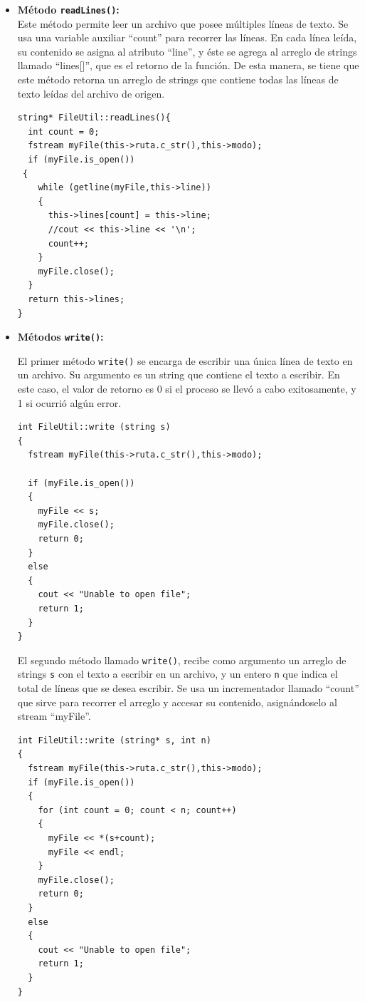\begin{itemize}
\item \textbf{Método \texttt{readLines()}:}\\

Este método permite leer un archivo que posee múltiples líneas de texto. Se usa una variable auxiliar ``count'' para recorrer las líneas. En cada línea leída, su contenido se asigna al atributo ``line'', y éste se agrega al arreglo de strings llamado ``lines[]'', que es el retorno de la función. De esta manera, se tiene que este método retorna un arreglo de strings que contiene todas las líneas de texto leídas del archivo de origen. 

\begin{verbatim}
string* FileUtil::readLines(){
  int count = 0;
  fstream myFile(this->ruta.c_str(),this->modo);
  if (myFile.is_open())
 {
    while (getline(myFile,this->line))
    {
      this->lines[count] = this->line;
      //cout << this->line << '\n';
      count++;
    }
    myFile.close();
  }
  return this->lines;
}
\end{verbatim}


\item \textbf{Métodos \texttt{write()}:}

El primer método \texttt{write()} se encarga de escribir una única línea de texto en un archivo. Su argumento es un string que contiene el texto a escribir. En este caso, el valor de retorno es 0 si el proceso se llevó a cabo exitosamente, y 1 si ocurrió algún error. 

\begin{verbatim}
int FileUtil::write (string s)
{
  fstream myFile(this->ruta.c_str(),this->modo);

  if (myFile.is_open())
  {
    myFile << s;
    myFile.close();
    return 0;
  }
  else
  {
    cout << "Unable to open file";
    return 1;
  }
}
\end{verbatim}

El segundo método llamado \texttt{write()}, recibe como argumento un arreglo de strings \texttt{s} con el texto a escribir en un archivo, y un entero \texttt{n} que indica el total de líneas que se desea escribir. Se usa un incrementador llamado ``count'' que sirve para recorrer el arreglo y accesar su contenido, asignándoselo al stream ``myFile''.

\begin{verbatim}
int FileUtil::write (string* s, int n)
{
  fstream myFile(this->ruta.c_str(),this->modo);
  if (myFile.is_open())
  {
    for (int count = 0; count < n; count++)
    {
      myFile << *(s+count);
      myFile << endl;
    }
    myFile.close();
    return 0;
  }
  else
  {
    cout << "Unable to open file";
    return 1;
  }
}
\end{verbatim}



\end{itemize}
